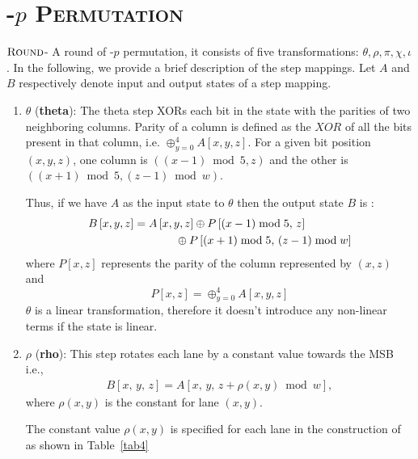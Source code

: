 \section{\textsc{\Keccak-$p$ Permutation}}
$\textsc{Round}$\;- A round of \KECCAK-$p$ permutation, it consists of five transformations: {$\theta,\rho,\pi,\chi,\iota$}. 
In the following, we provide a brief description of the step mappings.
 Let $A$ and $B$ respectively denote input and output states of a step mapping.
\begin{enumerate}
    \item $\theta$ ({\bf theta}): The theta step XORs each bit in the state with the parities of two neighboring columns. Parity of a column is defined as the $XOR$ of all the bits present in that column, i.e. $\oplus_{y = 0}^{4} A[x, y, z]$. For a given bit position $(x, y, z)$, one column is $((x - 1) \bmod 5, z) $ and the other is $((x+1)\bmod 5, (z - 1) \bmod w)$.
    
    Thus, if we have $A$ as the input state to $\theta$ then the output state $B$ is :
    \begin{align}\nonumber
        B\left[x, y, z\right] &= A\left[x, y, z\right] \oplus P\left[ (x - 1) \bmod 5 ,\, z \right] \\
        &\hspace{1.3cm}\oplus P\left[ (x + 1) \bmod 5 ,\, (z - 1) \bmod w \right]
    \end{align}
    where $P[x, z]$ represents the parity of the column represented by $(x, z)$ and 
    \[
        P[x, z]  = \oplus_{y = 0}^{4} A[x, y, z]
    \]
    $\theta$ is a linear transformation, therefore it doesn't introduce any non-linear terms if the state is linear.
    \vskip5pt
    \item $\rho$ ({\bf rho}): This step rotates each lane by a constant value towards the MSB i.e., 
    \begin{align}
        B[x, \,y,\, z] = A[x, \,y, \,z + \rho(x, y) \bmod w ],
    \end{align}
    where $\rho(x, y)$ is the constant for lane $(x, y)$. 
    
        The constant value $\rho(x, y)$ is specified for each lane in the construction of \Keccak{} as shown in Table~\ref{tab4}
        

\end{enumerate}
